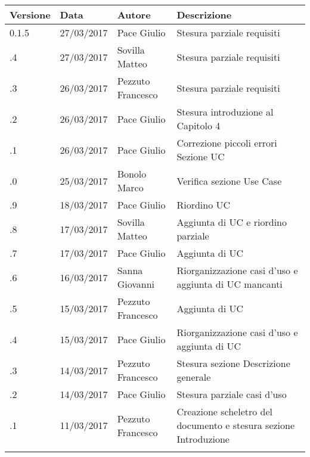 \newpage
\begin{longtabu} to \textwidth {
	X[4,l,p]
	X[4,l,p]
	X[4,l,p]
	X[8,l,p]}
	\toprule
		 Versione & Data & Autore & Descrizione \\
		\midrule
		\endhead
		0.1.5 & 27/03/2017 & Pace Giulio & Stesura parziale requisiti\\
		\addlinespace[0.2em]
		\midrule
		.4 & 27/03/2017 & Sovilla Matteo & Stesura parziale requisiti\\
		\addlinespace[0.2em]
		\midrule
		.3 & 26/03/2017 & Pezzuto Francesco & Stesura parziale requisiti\\
		\addlinespace[0.2em]
		\midrule
		.2 & 26/03/2017 & Pace Giulio & Stesura introduzione al Capitolo 4\\
		\addlinespace[0.2em]
		\midrule
		.1 & 26/03/2017 & Pace Giulio & Correzione piccoli errori Sezione UC\\
		\addlinespace[0.2em]
		\midrule
		.0 & 25/03/2017 & Bonolo Marco & Verifica sezione Use Case\\
		\addlinespace[0.2em]
		\midrule
		.9 & 18/03/2017 & Pace Giulio & Riordino UC\\
		\addlinespace[0.2em]
		\midrule
		.8 & 17/03/2017 & Sovilla Matteo & Aggiunta di UC e riordino parziale\\
		\addlinespace[0.2em]
		\midrule
		.7 & 17/03/2017 & Pace Giulio & Aggiunta di UC\\
		\addlinespace[0.2em]
		\midrule
		.6 & 16/03/2017 & Sanna Giovanni & Riorganizzazione casi d'uso e aggiunta di UC mancanti\\
		\addlinespace[0.2em]
		\midrule
		.5 & 15/03/2017 & Pezzuto Francesco & Aggiunta di UC\\
		\addlinespace[0.2em]
		\midrule
		.4 & 15/03/2017 & Pace Giulio & Riorganizzazione casi d'uso e aggiunta di UC\\
		\addlinespace[0.2em]
		\midrule
		.3 & 14/03/2017 & Pezzuto Francesco & Stesura sezione Descrizione generale\\
		\addlinespace[0.2em]
		\midrule
		.2 & 14/03/2017 & Pace Giulio & Stesura parziale casi d'uso\\
		\addlinespace[0.2em]
		\midrule
		.1 & 11/03/2017 & Pezzuto Francesco & Creazione scheletro del documento e stesura
		sezione Introduzione\\
		\addlinespace[0.4em]
		
	\bottomrule
\end{longtabu}